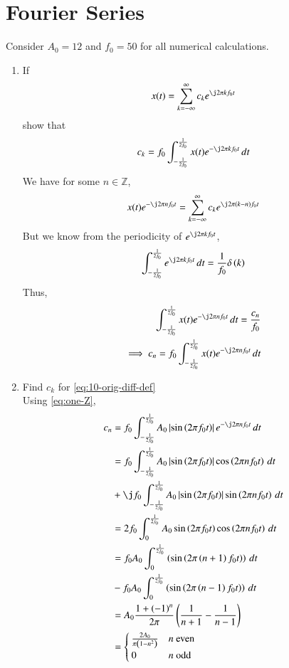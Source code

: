 \documentclass[journal,12pt,twocolumn]{IEEEtran}
\renewcommand\thesection{\arabic{section}}
\begin{document}
\section{Fourier Series}
Consider $A_0 =12$ and $f_0 = 50$ for all numerical calculations.
\begin{enumerate}[label=\thesection.\arabic*,ref=\thesection.\theenumi]
\item If
\begin{align}
	x(t) = \sum_{k = -\infty}^{\infty}c_ke^{\j2\pi kf_0 t}
\label{eq:one-Z-complex}
\end{align}
show that
\begin{align}
	c_k = f_0\int_{-\frac{1}{2f_0}}^{\frac{1}{2f_0}}x(t)e^{-\j2\pi kf_0 t}\, dt
\label{eq:one-Z}
\end{align}
\solution We have for some $n \in \mathbb{Z}$,
\begin{align}
    x(t)e^{-\j2\pi nf_0t} = \sum_{k = -\infty}^{\infty}c_ke^{\j2\pi (k - n)f_0 t}
\end{align}
But we know from the periodicity of $e^{\j2\pi kf_0t}$,
\begin{align}
    \int_{-\frac{1}{2f_0}}^{\frac{1}{2f_0}}e^{\j2\pi kf_0 t}\, dt = 
    \frac{1}{f_0}\delta\brak{k} 
\end{align}
Thus,
\begin{align}
    \int_{-\frac{1}{2f_0}}^{\frac{1}{2f_0}}x(t)e^{-\j2\pi nf_0 t}\, dt = 
    \frac{c_n}{f_0} \\
    \implies c_n = f_0\int_{-\frac{1}{2f_0}}^{\frac{1}{2f_0}}x(t)e^{-\j2\pi nf_0 t}\, dt 
\end{align}
	\item Find $c_k$ for
	\eqref{eq:10-orig-diff-def}\\
	\solution Using \eqref{eq:one-Z},
	\begin{align}
		c_n &= f_0\int_{-\frac{1}{2f_0}}^{\frac{1}{2f_0}}A_0\abs{\sin\brak{2\pi f_0t}}
		e^{-\j2\pi nf_0t}\, dt \\
			&= f_0\int_{-\frac{1}{2f_0}}^{\frac{1}{2f_0}}A_0\abs{\sin\brak{2\pi f_0t}}
		\cos\brak{2\pi nf_0t}\, dt \nonumber \\
			&+ \j f_0\int_{-\frac{1}{2f_0}}^{\frac{1}{2f_0}}A_0
			\abs{\sin\brak{2\pi f_0t}}\sin\brak{2\pi nf_0t}\, dt \\
			&= 2f_0\int_{0}^{\frac{1}{2f_0}}A_0\sin\brak{2\pi f_0t}\cos\brak{2\pi nf_0t}\, dt \\
			&= f_0A_0\int_{0}^{\frac{1}{2f_0}}\brak{\sin\brak{2\pi\brak{n+1}f_0t}}\, dt \nonumber \\ 
			&- f_0A_0\int_{0}^{\frac{1}{2f_0}}\brak{\sin\brak{2\pi\brak{n-1}f_0t}}\, dt \\ 
			&= A_0\frac{1+\brak{-1}^n}{2\pi}\brak{\frac{1}{n+1} - \frac{1}{n-1}} \\
			&= 
			\begin{cases}
				\frac{2A_0}{\pi\brak{1-n^2}} & n\ \text{even} \\
				0 & n\ \text{odd}
			\end{cases}
	\end{align}


\end{enumerate}
\end{document}

